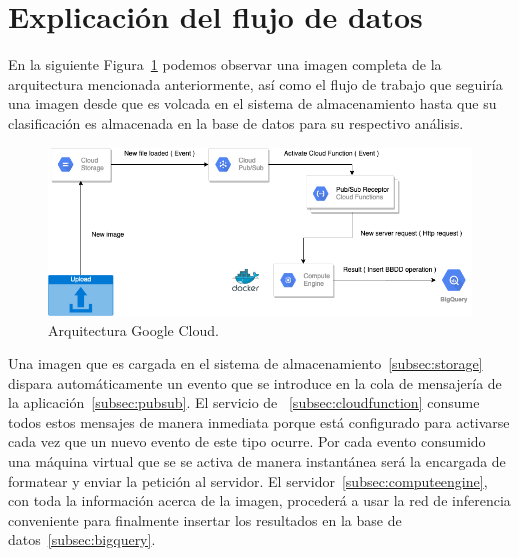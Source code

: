 \section{Explicación del flujo de datos}\label{sec:explicación-del-flujo-de-la-arquitectura}
En la siguiente Figura~\ref{fig:Arquitectura Google Cloud} podemos observar una imagen completa de la arquitectura mencionada anteriormente, así como el flujo de trabajo que seguiría una imagen desde que es volcada en el sistema de almacenamiento hasta que su clasificación es almacenada en la base de datos para su respectivo análisis.
\begin{figure}
    \centering
    \includegraphics[width=1.0\textwidth]{images/chapter4/google_cloud_architecture.png}
    \caption{Arquitectura Google Cloud.}
    \label{fig:Arquitectura Google Cloud}
\end{figure}
Una imagen que es cargada en el sistema de almacenamiento~\ref{subsec:storage} dispara automáticamente un evento que se introduce en la cola de mensajería de la aplicación~\ref{subsec:pubsub}.
El servicio de ~\ref{subsec:cloudfunction} consume todos estos mensajes de manera inmediata porque está configurado para activarse cada vez que un nuevo evento de este tipo ocurre.
Por cada evento consumido una máquina virtual que se se activa de manera instantánea será la encargada de formatear y enviar la petición al servidor.
El servidor~\ref{subsec:computeengine}, con toda la información acerca de la imagen, procederá a usar la red de inferencia conveniente para finalmente insertar los resultados en la base de datos~\ref{subsec:bigquery}.

